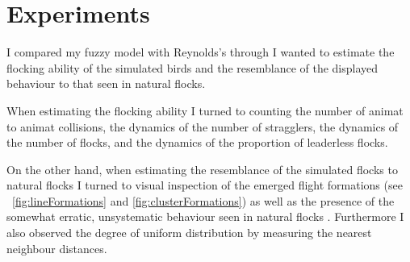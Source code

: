 
\section{Experiments}
\label{sec:analysis:comparison}
I compared my fuzzy model with Reynolds's through  I wanted to estimate the flocking ability of the simulated birds and the resemblance of the displayed behaviour to that seen in natural flocks. 
%
%

When estimating the flocking ability I turned to counting the number of animat to animat collisions, the dynamics of the number of stragglers, the dynamics of the number of flocks, and the dynamics of the proportion of leaderless flocks. 

On the other hand, when estimating the resemblance of the simulated flocks to natural flocks I turned to visual inspection of the emerged flight formations (see \figs~\ref{fig:lineFormations} and \ref{fig:clusterFormations}) as well as the presence of the somewhat erratic, unsystematic behaviour seen in natural flocks \cite{heppner:1990}.  Furthermore I also observed the degree of uniform distribution by measuring the nearest neighbour distances. 

